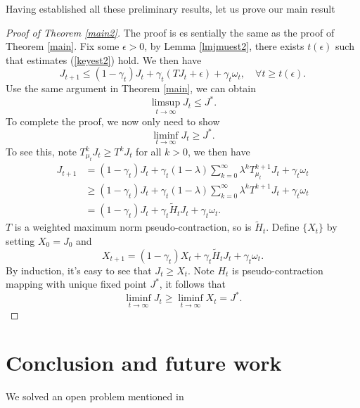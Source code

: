 \documentclass[12pt,a4paper]{amsart}
\numberwithin{equation}{section}
\theoremstyle{plain}
\theoremstyle{definition}
\begin{document}
Having established all these preliminary results, let us prove our main result 
\begin{proof}[Proof of Theorem \ref{main2}]
	The proof is es	sentially the same as the proof of Theorem \ref{main}. Fix some $\epsilon > 0$, by Lemma \ref{lmjmuest2}, there exists $t(\epsilon)$ such that estimates (\ref{keyest2}) hold. We then have
	$$
	J_{t+ 1} \le (1-\gamma_t)J_t + \gamma_t(TJ_t + \epsilon)  + \gamma_t \omega_t,  \quad \forall t \ge t(\epsilon).
	$$
	Use the same argument in Theorem \ref{main}, we can obtain 
	$$
	\limsup_{t  \to \infty} J_t \le J^{*}.
	$$
	To complete the proof, we now only need to show
	\begin{equation}
	\liminf_{t \to \infty} J_t \ge J^{*}.
	\end{equation}
	To see this, note $T_{\mu_t}^k J_t \ge T^k J_t$ for all $k > 0$, we then have
	$$
	\begin{aligned}
	J_{t+1} & = (1-\gamma_t) J_t + \gamma_t (1-\lambda) \sum_{k=0}^{\infty} \lambda^k T_{\mu_t}^{k+1} J_t + \gamma_t \omega_t \\
	& \ge  (1-\gamma_t) J_t + \gamma_t (1-\lambda) \sum_{k=0}^{\infty} \lambda^k T^{k+1} J_t + \gamma_t \omega_t \\
	& =  (1-\gamma_t) J_t + \gamma_t \tilde{H}_t J_t + \gamma_t \omega_t.
	\end{aligned}
	$$
	$T$ is a weighted maximum norm pseudo-contraction, so is $\tilde{H}_t$. Define $\{X_t\}$ by setting $X_0 = J_0$ and
	$$
	X_{t+1}= (1-\gamma_t) X_t + \gamma_t \tilde{H}_t J_t + \gamma_t\omega_t. 
	$$
	By induction, it's easy to see that $J_t \ge X_t$. Note $H_t$ is pseudo-contraction mapping with unique fixed point $J^{*}$,  it follows that 
	$$
	\liminf_{t \to \infty} J_t \ge \liminf_{t \to \infty} X_t = J^{*}.
	$$
\end{proof}

\section{Conclusion and future work}
We solved an open problem mentioned in \cite{Ts03}



\appendix
\raggedbottom\sloppy
\end{document}
